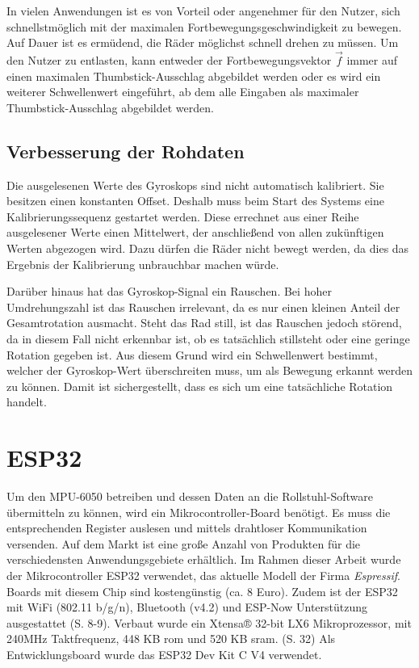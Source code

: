 In vielen Anwendungen ist es von Vorteil oder angenehmer für den Nutzer, sich schnellstmöglich mit der maximalen Fortbewegungsgeschwindigkeit zu bewegen.
Auf Dauer ist es ermüdend, die Räder möglichst schnell drehen zu müssen.
Um den Nutzer zu entlasten, kann entweder der Fortbewegungsvektor $\vec{f}$ immer auf einen maximalen Thumbstick-Ausschlag abgebildet werden oder es wird ein weiterer Schwellenwert eingeführt, ab dem alle Eingaben als maximaler Thumbstick-Ausschlag abgebildet werden.

\subsection{Verbesserung der Rohdaten}
Die ausgelesenen Werte des Gyroskops sind nicht automatisch kalibriert.
Sie besitzen einen konstanten Offset. Deshalb muss beim Start des Systems eine Kalibrierungssequenz gestartet werden.
Diese errechnet aus einer Reihe ausgelesener Werte einen Mittelwert, der anschließend von allen zukünftigen Werten abgezogen wird.
Dazu dürfen die Räder nicht bewegt werden, da dies das Ergebnis der Kalibrierung unbrauchbar machen würde.

Darüber hinaus hat das Gyroskop-Signal ein Rauschen.
Bei hoher Umdrehungszahl ist das Rauschen irrelevant, da es nur einen kleinen Anteil der Gesamtrotation ausmacht.
Steht das Rad still, ist das Rauschen jedoch störend, da in diesem Fall nicht erkennbar ist, ob es tatsächlich stillsteht oder eine geringe Rotation gegeben ist.
Aus diesem Grund wird ein Schwellenwert bestimmt, welcher der Gyroskop-Wert überschreiten muss, um als Bewegung erkannt werden zu können.
Damit ist sichergestellt, dass es sich um eine tatsächliche Rotation handelt.

\section{ESP32}
Um den MPU-6050 betreiben und dessen Daten an die Rollstuhl-Software übermitteln zu können, wird ein Mikrocontroller-Board benötigt.
Es muss die entsprechenden Register auslesen und mittels drahtloser Kommunikation versenden.
Auf dem Markt ist eine große Anzahl von Produkten für die verschiedensten Anwendungsgebiete erhältlich.
Im Rahmen dieser Arbeit wurde der Mikrocontroller ESP32 verwendet, das aktuelle Modell der Firma \textit{Espressif}.
Boards mit diesem Chip sind kostengünstig (ca. 8 Euro).
Zudem ist der ESP32 mit WiFi (802.11 b/g/n), Bluetooth (v4.2) und ESP-Now Unterstützung ausgestattet (S. 8-9)\cite{ESP32Datasheet2022}.
Verbaut wurde ein Xtensa® 32-bit LX6 Mikroprozessor, mit 240MHz Taktfrequenz, 448 KB \ac{rom} und 520 KB \ac{sram}. (S. 32)\cite{ESP32Datasheet2022}
Als Entwicklungsboard wurde das ESP32 Dev Kit C V4 verwendet.


